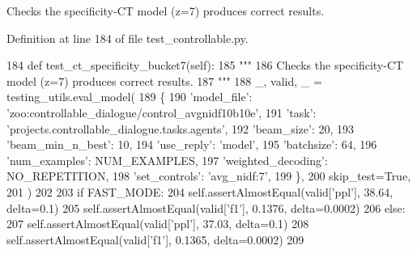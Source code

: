 \begin{DoxyVerb}Checks the specificity-CT model (z=7) produces correct results.
\end{DoxyVerb}
 

Definition at line 184 of file test\+\_\+controllable.\+py.


\begin{DoxyCode}
184     \textcolor{keyword}{def }test\_ct\_specificity\_bucket7(self):
185         \textcolor{stringliteral}{"""}
186 \textcolor{stringliteral}{        Checks the specificity-CT model (z=7) produces correct results.}
187 \textcolor{stringliteral}{        """}
188         \_, valid, \_ = testing\_utils.eval\_model(
189             \{
190                 \textcolor{stringliteral}{'model\_file'}: \textcolor{stringliteral}{'zoo:controllable\_dialogue/control\_avgnidf10b10e'},
191                 \textcolor{stringliteral}{'task'}: \textcolor{stringliteral}{'projects.controllable\_dialogue.tasks.agents'},
192                 \textcolor{stringliteral}{'beam\_size'}: 20,
193                 \textcolor{stringliteral}{'beam\_min\_n\_best'}: 10,
194                 \textcolor{stringliteral}{'use\_reply'}: \textcolor{stringliteral}{'model'},
195                 \textcolor{stringliteral}{'batchsize'}: 64,
196                 \textcolor{stringliteral}{'num\_examples'}: NUM\_EXAMPLES,
197                 \textcolor{stringliteral}{'weighted\_decoding'}: NO\_REPETITION,
198                 \textcolor{stringliteral}{'set\_controls'}: \textcolor{stringliteral}{'avg\_nidf:7'},
199             \},
200             skip\_test=\textcolor{keyword}{True},
201         )
202 
203         \textcolor{keywordflow}{if} FAST\_MODE:
204             self.assertAlmostEqual(valid[\textcolor{stringliteral}{'ppl'}], 38.64, delta=0.1)
205             self.assertAlmostEqual(valid[\textcolor{stringliteral}{'f1'}], 0.1376, delta=0.0002)
206         \textcolor{keywordflow}{else}:
207             self.assertAlmostEqual(valid[\textcolor{stringliteral}{'ppl'}], 37.03, delta=0.1)
208             self.assertAlmostEqual(valid[\textcolor{stringliteral}{'f1'}], 0.1365, delta=0.0002)
209 
\end{DoxyCode}
\mbox{\label{classtest__controllable_1_1TestControllableDialogue_afb3df76378e7449db2a4122568d8a8b2}} 
